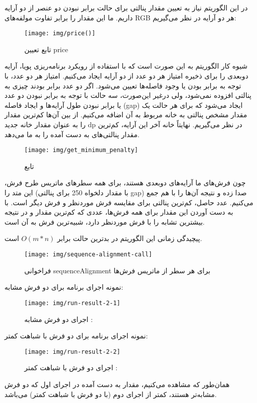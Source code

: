 \documentclass[12pt]{article}
\begin{document}
	در این الگوریتم نیاز به تعیین مقدار پنالتی برای حالت برابر نبودن دو عنصر از دو آرایه داریم. ما این مقدار را برابر تفاوت مولفه‌های RGB هر دو آرایه در نظر می‌گیریم:
	\begin{figure}[H]
		\centering
		\texttt{[image: img/price()]}
		\caption{تابع تعیین price}
		\label{fig:price}
	\end{figure}
	شیوه کار الگوریتم به این صورت است که با استفاده از رویکرد برنامه‌ریزی پویا، آرایه دوبعدی  را برای ذخیره امتیاز هر دو عدد از دو آرایه ایجاد می‌کنیم. امتیاز هر دو عدد، با توجه به برابر بودن یا وجود فاصله‌ها تعیین می‌شود. اگر دو عدد برابر بودند چیزی به پنالتی افزوده نمی‌شود، ولی درغیر این‌صورت،‌ سه حالت با توجه به برابر نبودن دو عدد یا برابر نبودن طول آرایه‌ها و ایجاد فاصله (gap) ایجاد می‌شود که برای هر حالت یک مقدار مشخص پنالتی به خانه مربوط به آن اضافه می‌کنیم. از بین آن‌ها کم‌ترین مقدار را به عنوان مقدار خانه جدید dp در نظر می‌گیریم.
	نهایتاً خانه آخر این آرایه، کم‌ترین مقدار پنالتی‌های به دست آمده را به ما می‌دهد.\\
	\begin{figure}[H]
		\centering
		\texttt{[image: img/get\_minimum\_penalty]}
		\caption{تابع }
		\label{fig:getminimumpenalty}
	\end{figure}
	چون فرش‌های ما آرایه‌های دوبعدی هستند، برای همه سطرهای ماتریس طرح فرش، این متد را (با مقدار دلخواه 250 برای پنالتی gap) صدا زده و نتیجه آن‌ها را با هم جمع می‌کنیم. عدد حاصل، کم‌ترین پنالتی برای مقایسه فرش موردنظر و فرش دیگر است. با به دست آوردن این مقدار برای همه فرش‌ها، عددی که کم‌ترین مقدار و در نتیجه بیشترین تشابه را با فرش موردنظر دارد، شبیه‌ترین فرش به آن است.

	پیچیدگی زمانی این الگوریتم در بدترین حالت برابر
	$O(m*n)$
	است.
	\begin{figure}[H]
		\centering
		\texttt{[image: img/sequence-alignment-call]}
		\caption{فراخوانی sequenceAlignment برای هر سطر از ماتریس فرش‌ها}
		\label{fig:sequence-alignment-call}
	\end{figure}
	نمونه اجرای برنامه برای دو فرش مشابه:
	\begin{figure}[H]
		\centering
		\texttt{[image: img/run-result-2-1]}
		\caption{اجرای دو فرش مشابه : }
		\label{fig:run-result-2-1}
	\end{figure}
		نمونه اجرای برنامه برای دو فرش با شباهت کمتر:
	\begin{figure}[H]
		\centering
		\texttt{[image: img/run-result-2-2]}
		\caption{اجرای دو فرش با شباهت کمتر : }
		\label{fig:run-result-2-2}
	\end{figure}
	همان‌طور که مشاهده می‌کنیم، مقدار به دست آمده در اجرای اول که دو فرش مشابه‌تر هستند، کمتر از اجرای دوم (با دو فرش با شباهت کمتر) می‌باشد.
\end{document}
